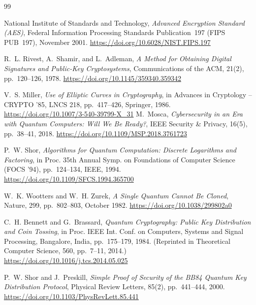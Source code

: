 \documentclass[12pt, a4paper]{article}
\begin{document}
\newpage
\begin{thebibliography}{99}

    National Institute of Standards and Technology,
    \textit{Advanced Encryption Standard (AES)},
    Federal Information Processing Standards Publication~197
    (FIPS PUB~197), November 2001.
    \url{https://doi.org/10.6028/NIST.FIPS.197}

    R.~L. Rivest, A.~Shamir, and L.~Adleman,
    \textit{A Method for Obtaining Digital Signatures and Public-Key
    Cryptosystems},
    Communications of the ACM, 21(2), pp.~120--126, 1978.
    \url{https://doi.org/10.1145/359340.359342}

    V.~S. Miller,
    \textit{Use of Elliptic Curves in Cryptography},
    in Advances in Cryptology -- CRYPTO '85, LNCS 218, pp.~417--426,
    Springer, 1986.
    \url{https://doi.org/10.1007/3-540-39799-X_31}
    M.~Mosca,
    \textit{Cybersecurity in an Era with Quantum Computers: Will We Be
    Ready?},
    IEEE Security \& Privacy, 16(5), pp.~38--41, 2018.
    \url{https://doi.org/10.1109/MSP.2018.3761723}

    P.~W. Shor,
    \textit{Algorithms for Quantum Computation: Discrete Logarithms and
    Factoring},
    in Proc. 35th Annual Symp. on Foundations of Computer Science
    (FOCS '94), pp.~124--134, IEEE, 1994.
    \url{https://doi.org/10.1109/SFCS.1994.365700}

    W.~K. Wootters and W.~H. Zurek,
    \textit{A Single Quantum Cannot Be Cloned},
    Nature, 299, pp.~802--803, October 1982.
    \url{https://doi.org/10.1038/299802a0}

    C.~H. Bennett and G.~Brassard,
    \textit{Quantum Cryptography: Public Key Distribution and Coin
    Tossing},
    in Proc. IEEE Int. Conf. on Computers, Systems and Signal
    Processing, Bangalore, India, pp.~175--179, 1984.
    (Reprinted in Theoretical Computer Science, 560, pp.~7--11, 2014.)
    \url{https://doi.org/10.1016/j.tcs.2014.05.025}

    P.~W. Shor and J.~Preskill,
    \textit{Simple Proof of Security of the BB84 Quantum Key
    Distribution Protocol},
    Physical Review Letters, 85(2), pp.~441--444, 2000.
    \url{https://doi.org/10.1103/PhysRevLett.85.441}


\end{thebibliography}
\end{document}
